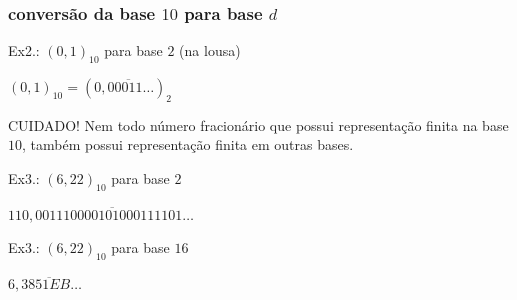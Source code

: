 \documentclass{beamer}
\newcommand{\comment}[1]{{\color{structure.fg!70!white}\footnotesize #1}}
\begin{document}
\begin{frame}
\frametitle{conversão da base $10$ para base $d$}

Ex2.: $(0,1)_{10}$ para base $2$ \comment{(na lousa)}

\vspace{12pt}
\pause

$(0,1)_{10} = (0,0\overline{0011}\ldots)_2$

\vspace{12pt}
\pause

CUIDADO! Nem todo número fracionário que possui representação finita na base $10$, também possui representação finita em outras bases.

\vspace{12pt}
\pause

Ex3.: $(6,22)_{10}$ para base $2$

\pause
$110,0\overline{01110000101000111101}\ldots$

\vspace{12pt}

Ex3.: $(6,22)_{10}$ para base $16$

\pause
$6,3\overline{851EB}\ldots$

\end{frame}
\end{document}
